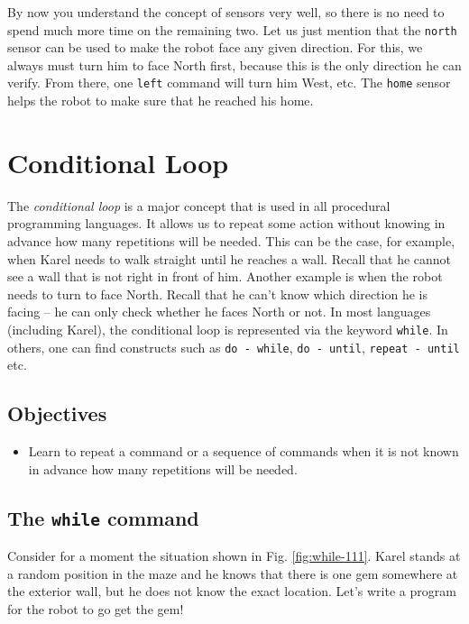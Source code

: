 By now you understand the concept of sensors very well, so there is no need to 
spend much more time on the remaining two. Let us just mention that the {\tt north} 
sensor can be used to make the robot face any given direction. For this,
we always must turn him to face North first, because this is the only 
direction he can verify. From there, one {\tt left} command will turn him 
West, etc. The {\tt home} sensor helps the robot to make sure that he reached his home. 




\section{Conditional Loop} \label{sec:whilek}

The {\em conditional loop} is a major concept that is used in all procedural 
programming languages. It allows us to repeat some action without knowing 
in advance how many repetitions will be needed. This can be the case, for example, 
when Karel needs to walk straight until he reaches a wall. Recall that he cannot see a wall
that is not right in front of him. Another example is when the robot needs to turn to face 
North. Recall that he can't know which direction he is facing -- he can only check 
whether he faces North or not.
In most languages (including Karel), the conditional loop is represented via the 
keyword {\tt while}. In others, one can find 
constructs such as {\tt do - while}, {\tt do - until},
{\tt repeat - until} etc.

\subsection{Objectives} 
 
\begin{itemize}
\item Learn to repeat a command or a sequence of commands when it is not known 
      in advance how many repetitions will be needed.
\end{itemize}
\newpage

\subsection{The {\tt while} command}

Consider for a moment the situation shown in Fig. \ref{fig:while-111}. Karel 
stands at a random position in the maze and he knows that there is one gem 
somewhere at the exterior wall, but he does not 
know the exact location. Let's write a program for the robot to go get the gem!

